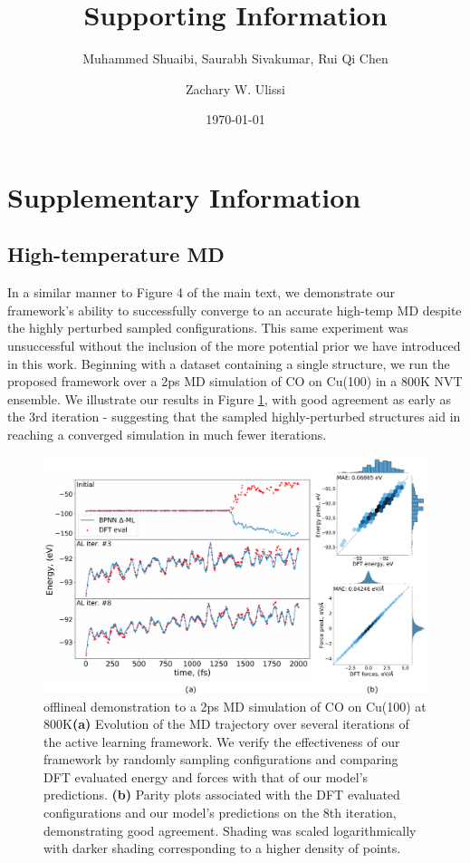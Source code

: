 \documentclass[
 reprint,
 amsmath,amssymb,
 aps,
]{revtex4-1}
\begin{document}
\title{Supporting Information}

\author{Muhammed Shuaibi, Saurabh Sivakumar, Rui Qi Chen}
\author{Zachary W. Ulissi}%
%

\date{\today}
            
             
\section{Supplementary Information}
\renewcommand{\theequation}{S.\arabic{equation}}
\renewcommand\thefigure{S.\arabic{figure}}
\setcounter{figure}{0}  
\setcounter{equation}{0}
\subsection{High-temperature MD}
In a similar manner to Figure 4 of the main text, we demonstrate our framework's ability to successfully converge to an accurate high-temp MD despite the highly perturbed sampled configurations. This same experiment was unsuccessful without the inclusion of the more potential prior we have introduced in this work. Beginning with a dataset containing a single structure, we run the proposed framework over a 2ps MD simulation of CO on Cu(100) in a 800K NVT ensemble. We illustrate our results in Figure \ref{fig:almd_800k}, with good agreement as early as the 3rd iteration - suggesting that the sampled highly-perturbed structures aid in reaching a converged simulation in much fewer iterations.

\begin{figure}[ht!]
    \centering
    \includegraphics[width=\textwidth]{figures/figure_s1.pdf}
    \caption{ \gls{offlineal} demonstration to a 2ps MD simulation of CO on Cu(100) at 800K\textbf{(a)} Evolution of the MD trajectory over several iterations of the active learning framework. We verify the effectiveness of our framework by randomly sampling configurations and comparing DFT evaluated energy and forces with that of our model's predictions. \textbf{(b)} Parity plots associated with the DFT evaluated configurations and our model's predictions on the 8th iteration, demonstrating good agreement. Shading was scaled logarithmically with darker shading corresponding to a higher density of points. 
    }
    \label{fig:almd_800k}
\end{figure}
\end{document}
